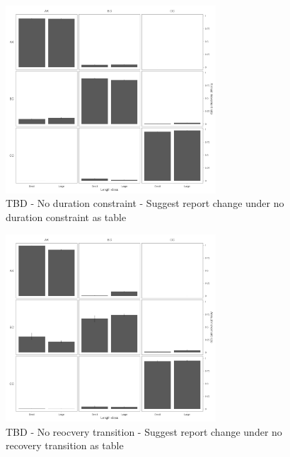 \documentclass{article}
\begin{document}
\begin{figure}[htb]
    \centering
    \includegraphics[width = 0.7\textwidth]{bar-regions-3-size-no-duration-constraint}
    \caption{TBD - No duration constraint - Suggest report change under no duration constraint as table}
    \label{fig:bar-regions-3-size-no-duration-constraint}
\end{figure}

\begin{figure}[htb]
    \centering
    \includegraphics[width = 0.7\textwidth]{bar-regions-3-size-no-recovery-transition}
    \caption{TBD - No reocvery transition - Suggest report change under no recovery transition as table}
    \label{fig:bar-regions-3-size-no-recovery-transition}
\end{figure}
\end{document}
